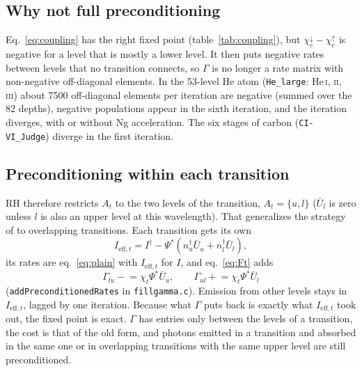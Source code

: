 \documentclass[11pt,a4paper]{article}
\newcommand{\code}[1]{\texttt{#1}}
\begin{document}
\subsection{Why not full preconditioning}
Eq.~\eqref{eq:coupling} has the right fixed point (table~\ref{tab:coupling}),
but $\chi^\downarrow_c-\chi^\uparrow_c$ is negative for a level that is
mostly a lower level. It then puts negative rates between levels that
no transition connects, so $\Gamma$ is no longer a rate matrix with
non-negative off-diagonal elements. In the 53-level He atom
(\code{He\_large}: He\,\textsc{i}, \textsc{ii}, \textsc{iii}) about 7500
off-diagonal elements per iteration are negative (summed over the 82
depths), negative populations appear in the sixth iteration, and the
iteration diverges, with or without Ng acceleration. The six stages of
carbon (\code{CI-VI\_Judge}) diverge in the first iteration.

\subsection{Preconditioning within each transition}
RH therefore restricts $A_t$ to the two levels of the transition,
$A_t=\{u,l\}$ ($\bar U_l$ is zero unless $l$ is also an upper level at
this wavelength). That generalizes the strategy of
\citet[\S2.4, eqs.~2.24--2.25]{1992A&A...262..209R} to overlapping
transitions. Each transition gets its own
\begin{equation}
  I_{\text{eff},t} = I^\dagger - \Psi^*\left(n_u^\dagger\bar U_u + n_l^\dagger\bar U_l\right),
\end{equation}
its rates are eq.~\eqref{eq:plain} with $I_{\text{eff},t}$ for $I$, and
eq.~\eqref{eq:Ft} adds
\begin{equation}
  \Gamma_{lu} \mathrel{-}= \chi_t\Psi^*\bar U_u, \qquad
  \Gamma_{ul} \mathrel{+}= \chi_t\Psi^*\bar U_l
  \label{eq:pertrans}
\end{equation}
(\code{addPreconditionedRates} in \code{fillgamma.c}). Emission from other levels stays in
$I_{\text{eff},t}$, lagged by one iteration. Because what $\Gamma$ puts
back is exactly what $I_{\text{eff},t}$ took out, the fixed point is
exact. $\Gamma$ has entries only between the levels of a transition,
the cost is that of the old form, and photons emitted in a transition
and absorbed in the same one or in overlapping transitions with the
same upper level are still preconditioned.
\end{document}
